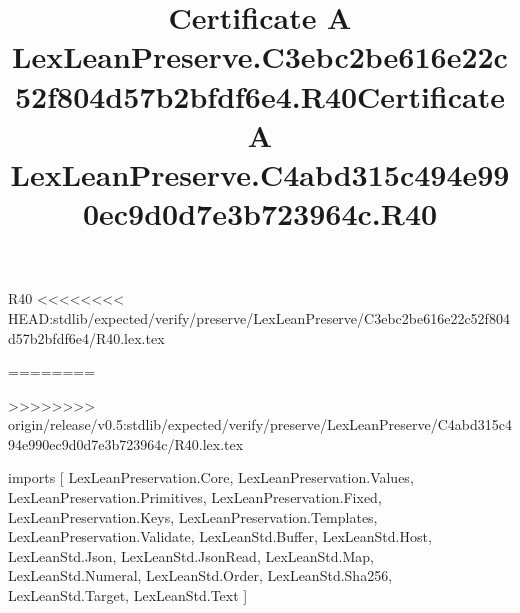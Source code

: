 \begin{lexlean}{R40}
<<<<<<<< HEAD:stdlib/expected/verify/preserve/LexLeanPreserve/C3ebc2be616e22c52f804d57b2bfdf6e4/R40.lex.tex
\title{Certificate A LexLeanPreserve.C3ebc2be616e22c52f804d57b2bfdf6e4.R40}
========
\title{Certificate A LexLeanPreserve.C4abd315c494e990ec9d0d7e3b723964c.R40}
>>>>>>>> origin/release/v0.5:stdlib/expected/verify/preserve/LexLeanPreserve/C4abd315c494e990ec9d0d7e3b723964c/R40.lex.tex
\begin{coremodule}
imports [
  LexLeanPreservation.Core,
  LexLeanPreservation.Values,
  LexLeanPreservation.Primitives,
  LexLeanPreservation.Fixed,
  LexLeanPreservation.Keys,
  LexLeanPreservation.Templates,
  LexLeanPreservation.Validate,
  LexLeanStd.Buffer,
  LexLeanStd.Host,
  LexLeanStd.Json,
  LexLeanStd.JsonRead,
  LexLeanStd.Map,
  LexLeanStd.Numeral,
  LexLeanStd.Order,
  LexLeanStd.Sha256,
  LexLeanStd.Target,
  LexLeanStd.Text
]


\end{coremodule}
\end{lexlean}
